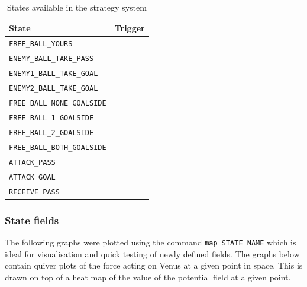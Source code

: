 \documentclass[a4paper,12pt]{article}
\begin{document}
\begin{table}[h!]
\centering
\begin{tabular}{ | l | l | }
\hline
\textbf{State} & \textbf{Trigger} \\ \hline
\texttt{FREE\_BALL\_YOURS} & \\ \hline
\texttt{ENEMY\_BALL\_TAKE\_PASS} &  \\ \hline
\texttt{ENEMY1\_BALL\_TAKE\_GOAL} &  \\ \hline
\texttt{ENEMY2\_BALL\_TAKE\_GOAL} &  \\ \hline
\texttt{FREE\_BALL\_NONE\_GOALSIDE} &  \\ \hline
\texttt{FREE\_BALL\_1\_GOALSIDE} &  \\ \hline
\texttt{FREE\_BALL\_2\_GOALSIDE} &  \\ \hline
\texttt{FREE\_BALL\_BOTH\_GOALSIDE} &  \\ \hline
\texttt{ATTACK\_PASS} &  \\ \hline
\texttt{ATTACK\_GOAL} &   \\ \hline
\texttt{RECEIVE\_PASS} &  \\ \hline
\end{tabular}
\caption{States available in the strategy system}
\label{tab:machine}
\end{table}

\subsubsection{State fields}

The following graphs were plotted using the command \texttt{map STATE\_NAME} which is ideal for visualisation and quick testing of newly defined fields. The graphs below contain quiver plots of the force acting on Venus at a given point in space. This is drawn on top of a heat map of the value of the potential field at a given point. 
\end{document}
